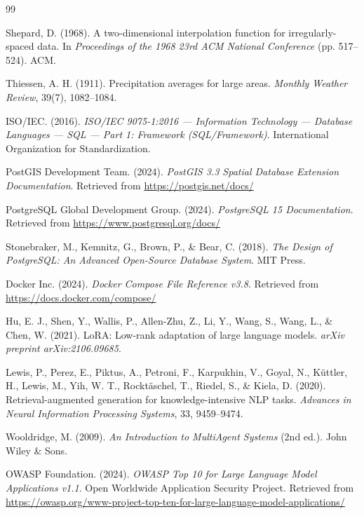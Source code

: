 \documentclass[12pt,a4paper]{report}
\begin{document}
\begin{thebibliography}{99}

 Shepard, D. (1968). A two-dimensional interpolation function for irregularly-spaced data. In \textit{Proceedings of the 1968 23rd ACM National Conference} (pp. 517--524). ACM.

 Thiessen, A. H. (1911). Precipitation averages for large areas. \textit{Monthly Weather Review}, 39(7), 1082--1084.


 ISO/IEC. (2016). \textit{ISO/IEC 9075-1:2016 --- Information Technology --- Database Languages --- SQL --- Part 1: Framework (SQL/Framework)}. International Organization for Standardization.

 PostGIS Development Team. (2024). \textit{PostGIS 3.3 Spatial Database Extension Documentation}. Retrieved from \url{https://postgis.net/docs/}

 PostgreSQL Global Development Group. (2024). \textit{PostgreSQL 15 Documentation}. Retrieved from \url{https://www.postgresql.org/docs/}

 Stonebraker, M., Kemnitz, G., Brown, P., \& Bear, C. (2018). \textit{The Design of PostgreSQL: An Advanced Open-Source Database System}. MIT Press.

 Docker Inc. (2024). \textit{Docker Compose File Reference v3.8}. Retrieved from \url{https://docs.docker.com/compose/}


 Hu, E. J., Shen, Y., Wallis, P., Allen-Zhu, Z., Li, Y., Wang, S., Wang, L., \& Chen, W. (2021). LoRA: Low-rank adaptation of large language models. \textit{arXiv preprint arXiv:2106.09685}.

 Lewis, P., Perez, E., Piktus, A., Petroni, F., Karpukhin, V., Goyal, N., Küttler, H., Lewis, M., Yih, W. T., Rocktäschel, T., Riedel, S., \& Kiela, D. (2020). Retrieval-augmented generation for knowledge-intensive NLP tasks. \textit{Advances in Neural Information Processing Systems}, 33, 9459--9474.

 Wooldridge, M. (2009). \textit{An Introduction to MultiAgent Systems} (2nd ed.). John Wiley \& Sons.

 OWASP Foundation. (2024). \textit{OWASP Top 10 for Large Language Model Applications v1.1}. Open Worldwide Application Security Project. Retrieved from \url{https://owasp.org/www-project-top-ten-for-large-language-model-applications/}

\end{thebibliography}
\end{document}
